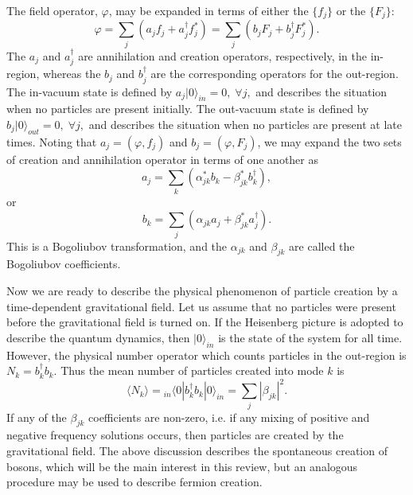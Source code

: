 \documentclass[12pt,onecolumn,eqsecnum,floats,aps,prd,floatfix,titlepage,tightenlines]{revtex4-2}
\begin{document}
The field operator, $\varphi$, may be expanded in terms of either the
$\{ f_j \}$ or the $\{ F_j \}$:
\begin{equation}
  \varphi = \sum\limits_j (a_j f_j + a_j^\dagger f_j^*)
  =\sum\limits_j (b_j F_j + b_j^\dagger F_j^*).
\end{equation}
The $a_j$ and $a_j^\dagger$ are annihilation and creation operators,
respectively, in the in-region, whereas the $b_j$ and $b_j^\dagger$
are the corresponding operators for the out-region. The in-vacuum state
is defined by $a_j|0\rangle_{in}=0, \; \forall j,$ and describes the
situation when no particles are present initially. The out-vacuum state
is defined by $b_j|0\rangle_{out}=0, \; \forall j,$ and describes the
situation when no particles are present at late times. Noting that
$a_j = (\varphi,f_j)$ and $b_j = (\varphi,F_j)$, we may expand the
two sets of creation and annihilation operator in terms of one another
as 
\begin{equation}
a_j=\sum\limits_k (\alpha _{jk}^*b_k-\beta _{jk}^* b_k^\dagger),
                                      \label{eq:Bogo1}
\end{equation}
or 
\begin{equation}
b_k=\sum\limits_j (\alpha _{jk} a_j + \beta _{jk}^* a _j^\dagger).
                                       \label{eq:Bogo2}
\end{equation}
This is a Bogoliubov transformation, and the $\alpha_{jk}$ and
$\beta_{jk}$ are called the Bogoliubov coefficients.

   Now we are ready to describe the physical phenomenon of particle
creation by a time-dependent gravitational field. Let us assume that
no particles were present before the gravitational field is turned on.
If the Heisenberg picture is adopted to describe the quantum dynamics,
then $|0\rangle_{in}$ is the state of the system for all time. However,
the physical number operator which counts particles in the out-region
is $N_k = b_k^\dagger b_k$. Thus the mean number of particles created
into mode $k$ is 
\begin{equation}
\langle N_k \rangle = {}_{in}\langle 0|b_k^\dagger b_k |0\rangle_{in}
       = \sum\limits_j |{\beta _{jk}}|^2.
 \label{eq:N}      
\end{equation}
If any of the $\beta_{jk}$ coefficients are non-zero, i.e. if
any mixing of positive and negative frequency solutions occurs, then
particles are created by the gravitational field.  The above discussion describes the 
spontaneous creation of bosons, which will be the main interest in this review,
but an analogous procedure may be used to describe fermion creation.
 
\end{document}
